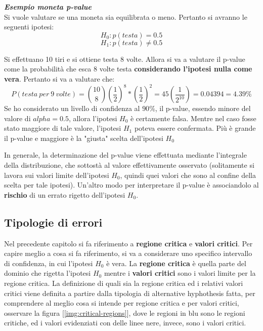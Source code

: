 \begin{info}
\textbf{\textit{Esempio moneta p-value}}\\
Si vuole valutare se una moneta sia equilibrata o meno. Pertanto si avranno le seguenti ipotesi:
\[
H_0: p(testa) = 0.5
\]
\[
H_1: p(testa) \not = 0.5
\]

Si effettuano 10 tiri e si ottiene testa 8 volte.
Allora si va a valutare il p-value come la probabilità che esca 8 volte testa \textbf{considerando l'ipotesi nulla come vera}. Pertanto si va a valutare che:
\[
P(testa\ per\ 9\ volte) = \binom{10}{8}\left (\frac{1}{2} \right )^8 * \left (\frac{1}{2} \right )^2 = 45\left (\frac{1}{2^10} \right ) = 0.04394 = 4.39\%
\]
Se ho considerato un livello di confidenza al \(90 \%\), il p-value, essendo minore del valore di \(alpha = 0.5\), allora l'ipotesi \(H_0\) è certamente falsa. Mentre nel caso fosse stato maggiore di tale valore, l'ipotesi \(H_1\) poteva essere confermata. Più è grande il p-value e maggiore è la "giusta" scelta dell'ipotesi \(H_0\)
\end{info}

In generale, la determinazione del p-value viene effettuata mediante l'integrale della distribuzione, che sottostà al valore effettivamente osservato (solitamente si lavora sui valori limite dell'ipotesi \(H_0\), quindi quei valori che sono al confine della scelta per tale ipotesi). 
Un'altro modo per interpretare il p-value è associandolo al \textbf{rischio} di un errato rigetto dell'ipotesi \(H_0\).

\subsection{Tipologie di errori}
Nel precedente capitolo si fa riferimento a \textbf{regione critica} e \textbf{valori critici}. Per capire meglio a cosa si fa riferimento, si va a considerare uno specifico intervallo di confidenza, in cui l'ipotesi \(H_0\) è vera. La \textbf{regione critica} è quella parte del dominio che rigetta l'ipotesi \(H_0\) mentre i \textbf{valori critici} sono i valori limite per la regione critica. La definizione di quali sia la regione critica ed i relativi valori critici viene definita a partire dalla tipologia di alternative hyphothesis fatta, per comprendere al meglio cosa si intende per regione critica e per valori critici, osservare la figura [\ref{img:critical-regions}], dove le regioni in blu sono le regioni critiche, ed i valori evidenziati con delle linee nere, invece, sono i valori critici.

